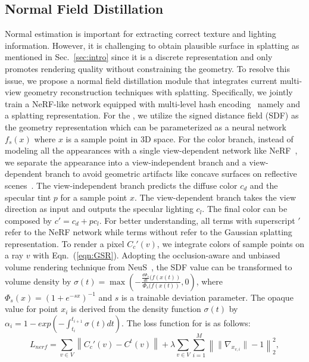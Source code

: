 \subsection{Normal Field Distillation}
\label{subsec:NFD}

Normal estimation is important for extracting correct texture and lighting information. 
However, it is challenging to obtain plausible surface  in  splatting as mentioned in Sec.~\ref{sec:intro} since it is a discrete representation and only promotes rendering quality without constraining the geometry. 
To resolve this issue, we propose a normal field distillation module that integrates current multi-view geometry reconstruction techniques with  splatting. 
Specifically, we jointly train a NeRF-like network equipped with multi-level hash encoding~\cite{InstantNGP} namely \neusbranch 
and a  splatting representation. 
For the \neusbranch, we utilize the signed distance field (SDF) as the geometry representation which can be parameterized as a neural network $f_s(x)$ where $x$ is a sample point in 3D space. 
For the color branch, instead of modeling all the appearances with a single view-dependent network like NeRF~\cite{NeRF}, we separate the appearance into a view-independent branch and a view-dependent branch to avoid geometric artifacts like concave surfaces on reflective scenes~\cite{Ref-NeuS, Factored-NeuS}. 
The view-independent branch predicts the diffuse color $c_d$ and the specular tint $p$ for a sample point $x$. 
The view-dependent branch takes the view direction as input and outputs the specular lighting $c_l$. 
The final color can be composed by $c' = c_d + p c_l$. 
For better understanding, all terms with superscript $'$ refer to the NeRF network while terms without refer to the Gaussian splatting representation. 
To render a pixel $C_c'(v)$, we integrate colors of sample points on a ray $v$ with Eqn.~(\ref{eqn:GSR}).
Adopting the occlusion-aware and unbiased volume rendering technique from NeuS~\cite{NeuS}, the SDF value can be transformed to volume density by $\sigma(t) = \max\left(-\frac{\frac{d\Phi_s}{dt}(f(x(t))}{\Phi_s(f(x(t))}, 0\right)$, where $\mathit{\Phi_s(x)=(1+e^{-sx})^{-1}}$ and $\mathit{s}$ is a trainable deviation parameter.
The opaque value for point $x_i$ is derived from the density function $\sigma(t)$ by $\alpha_i = 1 - exp\left(-\int_{t_i}^{t_{i+1}} \sigma(t) dt\right)$. 
The loss function for \neusbranch is as follows:
\begin{equation}
    \label{eqn:loss_refneus}
    L_{nerf} = \sum_{v {\in V}} \left\|C_c'(v) - C^{t}(v) \right\| + \lambda \sum_{v {\in V}} \sum_{i{=1}}^{M} \left\| \|\nabla_{x_{v, i}} \| - 1 \right\|_2^2,
\end{equation}
